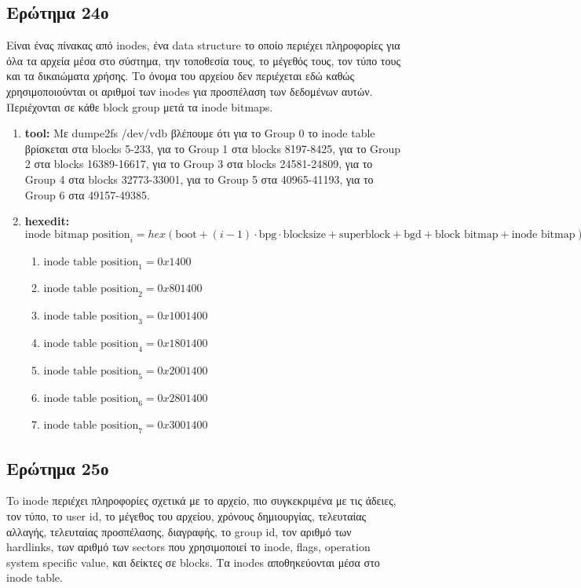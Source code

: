 \documentclass{article}
\begin{document}
\subsection{Ερώτημα 24ο}
Είναι ένας πίνακας από inodes, ένα data structure το οποίο περιέχει πληροφορίες για όλα τα αρχεία μέσα στο σύστημα, 
την τοποθεσία τους, το μέγεθός τους, τον τύπο τους και τα δικαιώματα χρήσης. Το όνομα του αρχείου
δεν περιέχεται εδώ καθώς χρησιμοποιούνται οι αριθμοί των inodes για προσπέλαση των δεδομένων αυτών.
Περιέχονται σε κάθε block group μετά τα inode bitmaps.\\
\begin{enumerate}
    \item{\textbf{tool:} Με dumpe2fs /dev/vdb βλέπουμε ότι για το Group 0 το inode table βρίσκεται στα blocks 5-233, για το 
        Group 1 στα blocks 8197-8425, για το Group 2 στα blocks 16389-16617, για το Group 3 στα blocks 24581-24809, για το Group 4 στα blocks 32773-33001,
        για το Group 5 στα 40965-41193, για το Group 6 στα 49157-49385.}
    \item{\textbf{hexedit:} $\text{inode bitmap position}_{i} = hex(\text{boot}+(i-1)\cdot\text{bpg}\cdot \text{blocksize}
            + \text{superblock} + \text{bgd} + \text{block bitmap} + \text{inode bitmap})$
    \begin{enumerate}
            \item{$\text{inode table position}_{1} = 0x1400$}
            \item{$\text{inode table position}_{2} = 0x801400$}
            \item{$\text{inode table position}_{3} = 0x1001400$}
            \item{$\text{inode table position}_{4} = 0x1801400$}
            \item{$\text{inode table position}_{5} = 0x2001400$}
            \item{$\text{inode table position}_{6} = 0x2801400$}
            \item{$\text{inode table position}_{7} = 0x3001400$}
    \end{enumerate}}
\end{enumerate}

\subsection{Ερώτημα 25ο}
To inode περιέχει πληροφορίες σχετικά με το αρχείο, πιο συγκεκριμένα με τις άδειες, τον τύπο, το user id, το μέγεθος
του αρχείου, χρόνους δημιουργίας, τελευταίας αλλαγής, τελευταίας προσπέλασης, διαγραφής, το group id, τον αριθμό
των hardlinks, των αριθμό των sectors που χρησιμοποιεί το inode, flags, operation system specific value, και δείκτες
σε blocks. Τα inodes αποθηκεύονται μέσα στο inode table.\\
\end{document}
